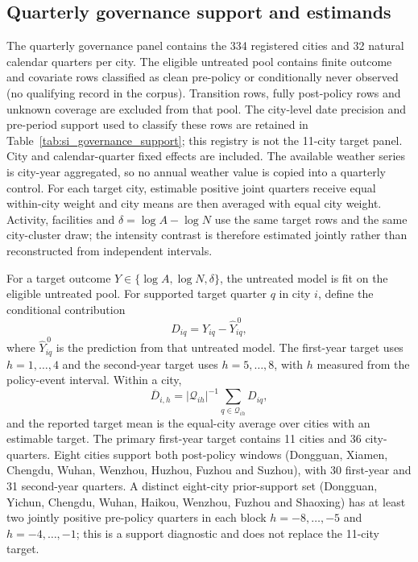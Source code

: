 \subsection{Quarterly governance support and estimands}
\label{sec:si-governance-methods}

The quarterly governance panel contains the 334 registered cities and 32
natural calendar quarters per city.  The eligible untreated pool contains
finite outcome and covariate rows classified as clean pre-policy or
conditionally never observed (no qualifying record in the corpus).  Transition
rows, fully post-policy rows and unknown coverage are excluded from that pool.
The city-level date precision and pre-period support used to classify these
rows are retained in Table~\ref{tab:si_governance_support}; this registry is
not the 11-city target panel.
City and calendar-quarter fixed effects are included.  The available weather
series is city-year aggregated, so no annual weather value is copied into a
quarterly control.  For each target city, estimable positive joint quarters
receive equal within-city weight and city means are then averaged with equal
city weight.  Activity, facilities and
$\delta=\log A-\log N$ use the same target rows and the same city-cluster
draw; the intensity contrast is therefore estimated jointly rather than
reconstructed from independent intervals.

For a target outcome $Y\in\{\log A,\log N,\delta\}$, the untreated model is
fit on the eligible untreated pool.  For supported target quarter $q$ in city
$i$, define the conditional contribution
\[
 D_{iq}=Y_{iq}-\widehat{Y}^{\,0}_{iq},
\]
where $\widehat{Y}^{\,0}_{iq}$ is the prediction from that untreated model.
The first-year target uses $h=1,\ldots,4$ and the second-year target uses
$h=5,\ldots,8$, with $h$ measured from the policy-event interval.  Within a
city,
\[
 \overline D_{i,h}=|\mathcal Q_{ih}|^{-1}
 \sum_{q\in\mathcal Q_{ih}}D_{iq},
\]
and the reported target mean is the equal-city average over cities with an
estimable target.  The primary first-year target contains 11 cities and 36
city-quarters.  Eight cities support both post-policy windows (Dongguan,
Xiamen, Chengdu, Wuhan, Wenzhou, Huzhou, Fuzhou and Suzhou), with 30
first-year and 31 second-year quarters.  A distinct eight-city prior-support
set (Dongguan, Yichun, Chengdu, Wuhan, Haikou, Wenzhou, Fuzhou and Shaoxing)
has at least two jointly positive pre-policy quarters in each block
$h=-8,\ldots,-5$ and $h=-4,\ldots,-1$; this is a support diagnostic and does
not replace the 11-city target.

